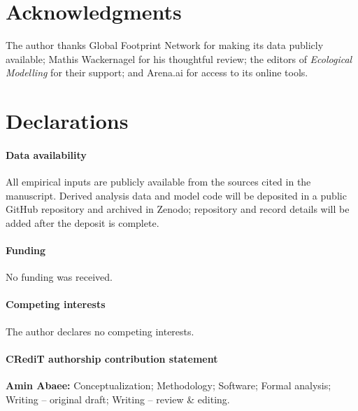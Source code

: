 \documentclass[preprint,12pt,authoryear]{elsarticle}
\begin{document}
\section*{Acknowledgments}

The author thanks Global Footprint Network for making its data publicly available; Mathis Wackernagel for his thoughtful review; the editors of \emph{Ecological Modelling} for their support; and Arena.ai for access to its online tools.

\section*{Declarations}

\paragraph{Data availability} All empirical inputs are publicly available from the sources cited in the manuscript. Derived analysis data and model code will be deposited in a public GitHub repository and archived in Zenodo; repository and record details will be added after the deposit is complete.

\paragraph{Funding} No funding was received.

\paragraph{Competing interests} The author declares no competing interests.

\paragraph{CRediT authorship contribution statement} \textbf{Amin Abaee:} Conceptualization; Methodology; Software; Formal analysis; Writing -- original draft; Writing -- review \& editing.
\end{document}
